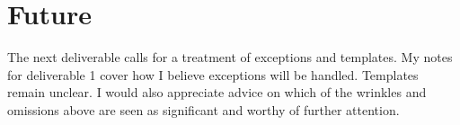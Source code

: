 \documentclass[11pt]{article}
\begin{document}
\section{Future}

The next deliverable calls for a treatment of exceptions and
templates.  My notes for deliverable 1 cover how I believe exceptions
will be handled.  Templates remain unclear.  I would also appreciate
advice on which of the wrinkles and omissions above are seen as
significant and worthy of further attention.



\end{document}
